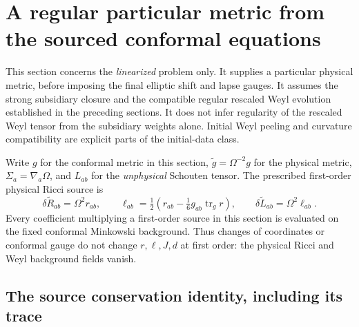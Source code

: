 \section{A regular particular metric from the sourced conformal equations}
\label{sec:sourced-cefe-reconstruction}

This section concerns the \emph{linearized} problem only.  It supplies a
particular physical metric, before imposing the final elliptic shift and
lapse gauges.  It assumes the strong subsidiary closure and the compatible
regular rescaled Weyl evolution established in the preceding sections.
It does not infer regularity of the rescaled Weyl tensor from the subsidiary
weights alone.  Initial Weyl peeling and curvature compatibility are explicit
parts of the initial-data class.

Write $g$ for the conformal metric in this section, $\widetilde g=\Omega^{-2}g$
for the physical metric, $\Sigma_a=\nabla_a\Omega$, and $L_{ab}$ for the
\emph{unphysical} Schouten tensor.  The prescribed first-order physical Ricci
source is
\[
 \delta\widetilde R_{ab}=\Omega^2r_{ab},\qquad
 \ell_{ab}=\tfrac12(r_{ab}-\tfrac16g_{ab}\operatorname{tr}_g r),
 \qquad \delta\widetilde L_{ab}=\Omega^2\ell_{ab}.
\]
Every coefficient multiplying a first-order source in this section is evaluated
on the fixed conformal Minkowski background.  Thus changes of coordinates or
conformal gauge do not change $r,\ell,J,d$ at first order: the physical Ricci
and Weyl background fields vanish.

\subsection{The source conservation identity, including its trace}

